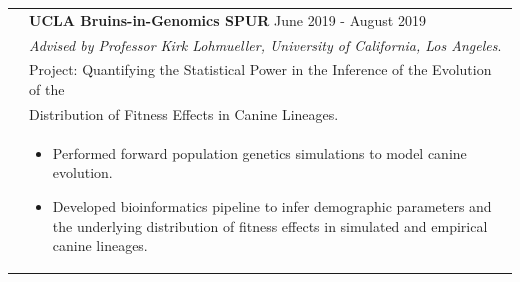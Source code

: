 \documentclass[letterpaper,11pt,oneside]{article}
\begin{document}
\begin{tabular}{@{} l l}
		& \textbf{UCLA Bruins-in-Genomics SPUR} \hfill June 2019 - August 2019 \\
      	& \textit{Advised by Professor Kirk Lohmueller, University of California, Los Angeles}. \\
      	& Project: Quantifying the Statistical Power in the Inference of the Evolution of the \\
      	& Distribution of Fitness Effects in Canine Lineages. \\
     	& 	\begin{minipage} [t] {0.85 \textwidth} 
     			\begin{itemize} 
     				\itemsep-0.4em 
      				\item Performed forward population genetics simulations to model canine evolution.
      				\item Developed bioinformatics pipeline to infer demographic parameters and the underlying distribution of fitness effects in simulated and empirical canine lineages.
      			\end{itemize} 
    		\end{minipage} \\

\end{tabular}	
\end{document}
